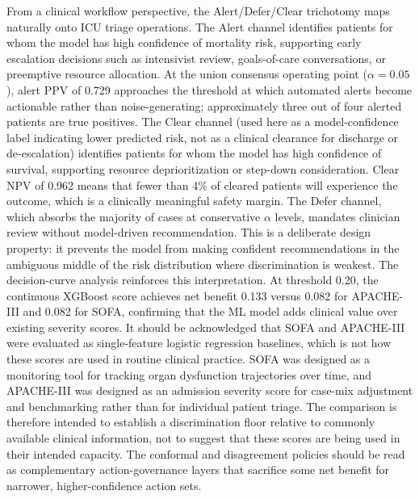From a clinical workflow perspective, the Alert/Defer/Clear trichotomy maps naturally onto ICU triage operations. The Alert channel identifies patients for whom the model has high confidence of mortality risk, supporting early escalation decisions such as intensivist review, goals-of-care conversations, or preemptive resource allocation. At the union consensus operating point ($\alpha = 0.05$), alert PPV of 0.729 approaches the threshold at which automated alerts become actionable rather than noise-generating; approximately three out of four alerted patients are true positives. The Clear channel (used here as a model-confidence label indicating lower predicted risk, not as a clinical clearance for discharge or de-escalation) identifies patients for whom the model has high confidence of survival, supporting resource deprioritization or step-down consideration. Clear NPV of 0.962 means that fewer than 4\% of cleared patients will experience the outcome, which is a clinically meaningful safety margin. The Defer channel, which absorbs the majority of cases at conservative $\alpha$ levels, mandates clinician review without model-driven recommendation. This is a deliberate design property: it prevents the model from making confident recommendations in the ambiguous middle of the risk distribution where discrimination is weakest. The decision-curve analysis reinforces this interpretation. At threshold 0.20, the continuous XGBoost score achieves net benefit 0.133 versus 0.082 for APACHE-III and 0.082 for SOFA, confirming that the ML model adds clinical value over existing severity scores.\cite{Vickers2006} It should be acknowledged that SOFA and APACHE-III were evaluated as single-feature logistic regression baselines, which is not how these scores are used in routine clinical practice. SOFA was designed as a monitoring tool for tracking organ dysfunction trajectories over time, and APACHE-III was designed as an admission severity score for case-mix adjustment and benchmarking rather than for individual patient triage. The comparison is therefore intended to establish a discrimination floor relative to commonly available clinical information, not to suggest that these scores are being used in their intended capacity. The conformal and disagreement policies should be read as complementary action-governance layers that sacrifice some net benefit for narrower, higher-confidence action sets.


